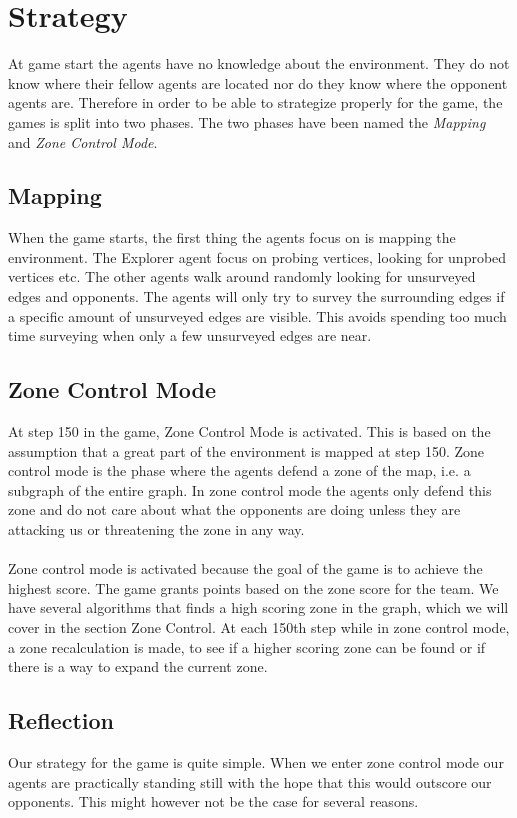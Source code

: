 \documentclass[11pt]{article}
\begin{document}
\section{Strategy}
At game start the agents have no knowledge about the environment. They do not know where their fellow agents are located nor do they know where the opponent agents are. Therefore in order to be able to strategize properly for the game, the games is split into two phases. The two phases have been named the \emph{Mapping} and \emph{Zone Control Mode}.

\subsection{Mapping}
When the game starts, the first thing the agents focus on is mapping the environment. The Explorer agent focus on probing vertices, looking for unprobed vertices etc. The other agents walk around randomly looking for unsurveyed edges and opponents. The agents will only try to survey the surrounding edges if a specific amount of unsurveyed edges are visible. This avoids spending too much time surveying when only a few unsurveyed edges are near.

\subsection{Zone Control Mode}
At step 150 in the game, Zone Control Mode is activated. This is based on the assumption that a great part of the environment is mapped at step 150. Zone control mode is the phase where the agents defend a zone of the map, i.e. a subgraph of the entire graph. In zone control mode the agents only defend this zone and do not care about what the opponents are doing unless they are attacking us or threatening the zone in any way.\\
\\
Zone control mode is activated because the goal of the game is to achieve the highest score. The game grants points based on the zone score for the team. We have several algorithms that finds a high scoring zone in the graph, which we will cover in the section Zone Control. At each 150th step while in zone control mode, a zone recalculation is made, to see if a higher scoring zone can be found or if there is a way to expand the current zone.

\subsection{Reflection}
Our strategy for the game is quite simple. When we enter zone control mode our agents are practically standing still with the hope that this would outscore our opponents. This might however not be the case for several reasons.
\end{document}
